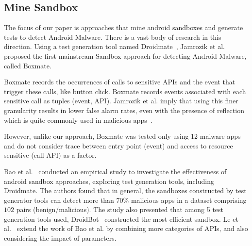 \subsection{Mine Sandbox}\label{sec:mineSandbox}

The focus of our paper is approaches that mine android sandboxes and generate tests to detect Android Malware. There is a vast body of research in this direction. Using a test generation tool named Droidmate~\cite{DBLP:conf/icse/JamrozikZ16}, Jamrozik et al.~\cite{DBLP:conf/icse/JamrozikSZ16} proposed the first mainstream Sandbox approach for detecting Android Malware, called Boxmate. 

Boxmate records the occurrences of calls to sensitive APIs and the event that trigger these calls, like button click. Boxmate records events associated with each sensitive call as tuples (event, API). Jamrozik et al. imply that using this finer granularity results in lower false alarm rates, even with the presence of reflection which is quite commonly used in malicious apps~\cite{DBLP:conf/issta/0029BOK16}. 

However, unlike our approach, Boxmate was tested only using 12 malware apps and do not consider trace  between entry point (event) and access to resource sensitive (call API) as a factor.

Bao et al.~\cite{DBLP:conf/wcre/BaoLL18} conducted an empirical study to investigate the effectiveness of android sandbox approaches, exploring test generation tools, including Droidmate. The authors found that in general, the sandboxes constructed by test generator tools can detect more than $70$\% malicious apps in a dataset comprising $102$ pairs (benign/malicious). The study also presented that among 5 test generation tools used, DroidBot~\cite{DBLP:conf/icse/LiYGC17} constructed the most efficient sandbox. Le et al.~\cite{le2018towards} extend the work of Bao et al. by combining more categories of APIs, and also considering the impact of parameters.

